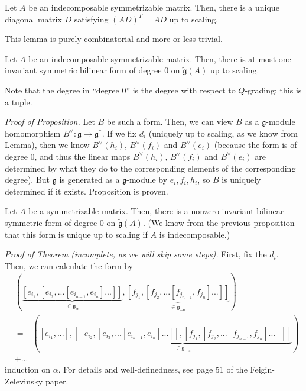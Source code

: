 \documentclass[etingof-lie.tex]{subfiles}
\begin{document}
\begin{lemma}
Let $A$ be an indecomposable symmetrizable matrix. Then, there is a unique
diagonal matrix $D$ satisfying $\left(  AD\right)  ^{T}=AD$ up to scaling.
\end{lemma}

This lemma is purely combinatorial and more or less trivial.

\begin{proposition}
Let $A$ be an indecomposable symmetrizable matrix. Then, there is at most one
invariant symmetric bilinear form of degree $0$ on $\widetilde{\mathfrak{g}%
}\left(  A\right)  $ up to scaling.
\end{proposition}

Note that the degree in ``degree $0$'' is the degree with respect to
$Q$-grading; this is a tuple.

\textit{Proof of Proposition.} Let $B$ be such a form. Then, we can view $B$
as a $\mathfrak{g}$-module homomorphism $B^{\vee}:\mathfrak{g}\rightarrow
\mathfrak{g}^{\ast}$. If we fix $d_{i}$ (uniquely up to scaling, as we know
from Lemma), then we know $B^{\vee}\left(  h_{i}\right)  $, $B^{\vee}\left(
f_{i}\right)  $ and $B^{\vee}\left(  e_{i}\right)  $ (because the form is of
degree $0$, and thus the linear maps $B^{\vee}\left(  h_{i}\right)  $,
$B^{\vee}\left(  f_{i}\right)  $ and $B^{\vee}\left(  e_{i}\right)  $ are
determined by what they do to the corresponding elements of the corresponding
degree). But $\mathfrak{g}$ is generated as a $\mathfrak{g}$-module by
$e_{i},f_{i},h_{i}$, so $B$ is uniquely determined if it exists. Proposition
is proven.

\begin{theorem}
Let $A$ be a symmetrizable matrix. Then, there is a nonzero invariant bilinear
symmetric form of degree $0$ on $\widetilde{\mathfrak{g}}\left(  A\right)  $.
(We know from the previous proposition that this form is unique up to scaling
if $A$ is indecomposable.)
\end{theorem}

\textit{Proof of Theorem (incomplete, as we will skip some steps).} First, fix
the $d_{i}$. Then, we can calculate the form by%
\begin{align*}
&  \left(  \underbrace{\left[  e_{i_{1}},\left[  e_{i_{2}},...\left[
e_{i_{n-1}},e_{i_{n}}\right]  ...\right]  \right]  }_{\in\mathfrak{g}_{\alpha
}},\underbrace{\left[  f_{j_{1}},\left[  f_{j_{2}},...\left[  f_{j_{n-1}%
},f_{j_{n}}\right]  ...\right]  \right]  }_{\in\mathfrak{g}_{-\alpha}}\right)
\\
&  =-\left(  \left[  e_{i_{1}},...\right]  ,\underbrace{\left[  \left[
e_{i_{2}},\left[  e_{i_{3}},...\left[  e_{i_{n-1}},e_{i_{n}}\right]
...\right]  \right]  ,\left[  f_{j_{1}},\left[  f_{j_{2}},...\left[
f_{j_{n-1}},f_{j_{n}}\right]  ...\right]  \right]  \right]  }_{\in
\mathfrak{g}_{-\alpha}}\right) \\
&  +...
\end{align*}
induction on $\alpha$. For details and well-definedness, see page 51 of the
Feigin-Zelevinsky paper.
\end{document}
